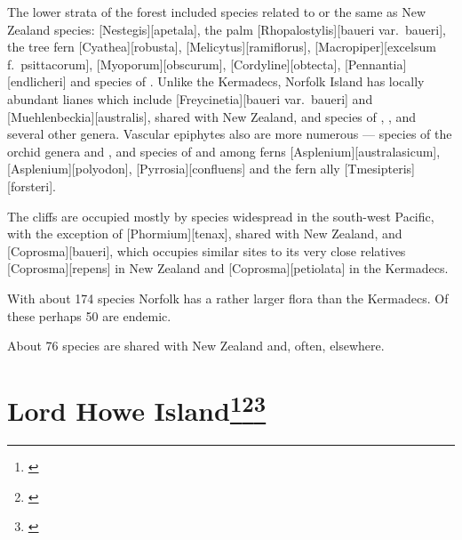 The lower strata of the forest included species related to or the same as New Zealand species: [Nestegis][apetala], the palm [Rhopalostylis][baueri var.\ baueri], the tree fern [Cyathea][robusta], [Melicytus][ramiflorus], [Macropiper][excelsum f.\ psittacorum], [Myoporum][obscurum], [Cordyline][obtecta], [Pennantia][endlicheri] and species of .
Unlike the Kermadecs, Norfolk Island has locally abundant lianes which include [Freycinetia][baueri var.\ baueri] and [Muehlenbeckia][australis], shared with New Zealand, and species of , ,  and several other genera.
Vascular epiphytes also are more numerous --- species of the orchid genera  and , and species of  and among ferns [Asplenium][australasicum], [Asplenium][polyodon], [Pyrrosia][confluens] and the fern ally [Tmesipteris][forsteri].

The cliffs are occupied mostly by species widespread in the south-west Pacific, with the exception of [Phormium][tenax], shared with New Zealand, and [Coprosma][baueri], which occupies similar sites to its very close relatives [Coprosma][repens] in New Zealand and [Coprosma][petiolata] in the Kermadecs.

With about 174 species Norfolk has a rather larger flora than the Kermadecs.
Of these perhaps 50 are endemic.

About 76 species are shared with New Zealand and, often, elsewhere.

\section[Lord Howe Island]{Lord Howe Island\thinspace\footnote{\cite{oliver1896vegetation}}\footnote{\cite{green1979observations}}\footnote{\cite{hutton1986lord}}}

